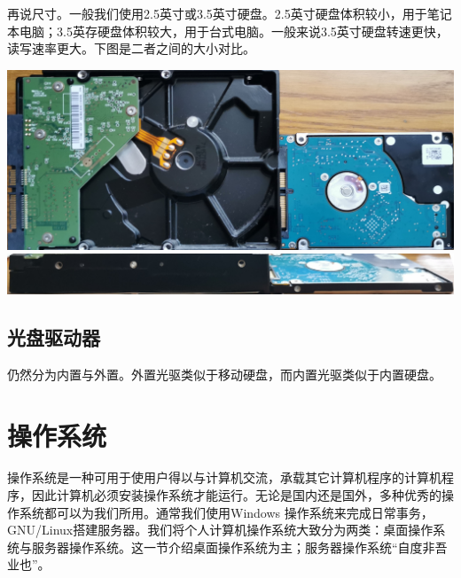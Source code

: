 再说尺寸。一般我们使用2.5英寸或3.5英寸硬盘。2.5英寸硬盘体积较小，用于笔记本电脑；3.5英存硬盘体积较大，用于台式电脑。一般来说3.5英寸硬盘转速更快，读写速率更大。下图是二者之间的大小对比。
\begin{center}
	\includegraphics[scale=0.05]{pic/HD2}\\\includegraphics[scale=0.05]{pic/HD3}	
\end{center} \par
\section{光盘驱动器}
仍然分为内置与外置。外置光驱类似于移动硬盘，而内置光驱类似于内置硬盘。
\chapter{操作系统}
操作系统是一种可用于使用户得以与计算机交流，承载其它计算机程序的计算机程序，因此计算机必须安装操作系统才能运行。无论是国内还是国外，多种优秀的操作系统都可以为我们所用。通常我们使用Windows 操作系统来完成日常事务，GNU/Linux搭建服务器。我们将个人计算机操作系统大致分为两类：桌面操作系统与服务器操作系统。这一节介绍桌面操作系统为主；服务器操作系统“自度非吾业也”。